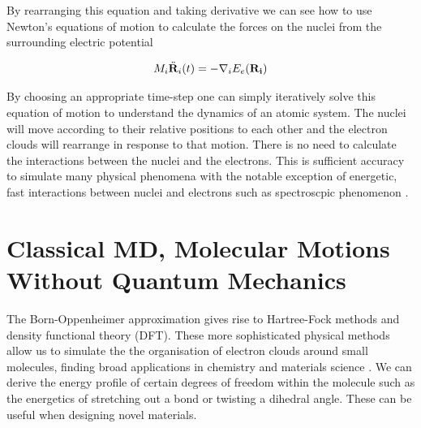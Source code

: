 By rearranging this equation and taking derivative we can see how to use Newton's equations of motion to calculate the forces on the nuclei from the surrounding electric potential 

\begin{equation}
	M_i \ddot{\bold{R}}_i (t) = -\nabla_i E_e (\bold{R_i})
	\label{Newtons_equations}
\end{equation}

By choosing an appropriate time-step one can simply iteratively solve this equation of motion to understand the dynamics of an atomic system. The nuclei will move according to their relative positions to each other and the electron clouds will rearrange in response to that motion. There is no need to calculate the interactions between the nuclei and the electrons. This is sufficient accuracy to simulate many physical phenomena with the notable exception of energetic, fast interactions between nuclei and electrons such as spectroscpic phenomenon \cite{sherrill}. 
%




%
%
%


\section{Classical MD, Molecular Motions Without Quantum Mechanics}
The Born-Oppenheimer approximation gives rise to Hartree-Fock methods and density functional theory (DFT). These more sophisticated physical methods allow us to simulate the the organisation of electron clouds around small molecules, finding broad applications in chemistry and materials science \cite{vanmourik2014}. We can derive the energy profile of certain degrees of freedom within the molecule such as the energetics of stretching out a bond or twisting a dihedral angle. These can be useful when designing novel materials. 

